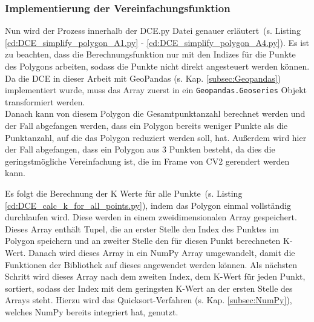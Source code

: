 {	\subsubsection{Implementierung der Vereinfachungsfunktion \label{impl:DCE_SimplyfierFunc}}

	Nun wird der Prozess innerhalb der DCE.py Datei genauer erläutert\ifimportant \ (s. Listing \ref{cd:DCE_simplify_polygon_A1.py} - \ref{cd:DCE_simplify_polygon_A4.py})\fi. Es ist zu beachten, dass die Berechnungsfunktion nur mit den Indizes für die Punkte des Polygons arbeiten, sodass die Punkte nicht direkt angesteuert werden können. Da die DCE in dieser Arbeit mit GeoPandas (s. Kap. \ref{subsec:Geopandas}) implementiert wurde, muss das Array zuerst in ein \lstinline|Geopandas.Geoseries| Objekt transformiert werden. \\
	Danach kann von diesem Polygon die Gesamtpunktanzahl berechnet werden und der Fall abgefangen werden, dass ein Polygon bereits weniger Punkte als die Punktanzahl, auf die das Polygon reduziert werden soll, hat. Außerdem wird hier der Fall abgefangen, dass ein Polygon aus 3 Punkten besteht, da dies die geringstmögliche Vereinfachung ist, die im Frame von CV2 gerendert werden kann. \\
	\ifimportant
	
	\fi	Es folgt die Berechnung der K Werte für alle Punkte\ifimportant \ (s. Listing \ref{cd:DCE_calc_k_for_all_points.py})\fi, indem das Polygon einmal vollständig durchlaufen wird. Diese werden in einem zweidimensionalen Array gespeichert. Dieses Array enthält Tupel, die an erster Stelle den Index des Punktes im Polygon speichern und an zweiter Stelle den für diesen Punkt berechneten K-Wert. Danach wird dieses Array in ein NumPy Array umgewandelt, damit die Funktionen der Bibliothek auf dieses angewendet werden können. Als nächsten Schritt wird dieses Array nach dem zweiten Index, dem K-Wert für jeden Punkt, sortiert, sodass der Index mit dem geringsten K-Wert an der ersten Stelle des Arrays steht. Hierzu wird das Quicksort-Verfahren (s. Kap. \ref{subsec:NumPy}), welches NumPy bereits integriert hat, genutzt. \\
	\ifimportant
	
}
